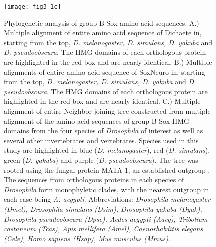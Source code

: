\begin{figure}[H]
\centering
\texttt{[image: fig3-1c]}
\caption{Phylogenetic analysis of group B Sox amino acid sequences. A.) Multiple alignment of entire amino acid sequence of Dichaete in, starting from the top, \emph{D. melanogaster, D. simulans, D. yakuba} and \emph{D. pseudoobscura}. The HMG domains of each orthologous protein are highlighted in the red box and are nearly identical. B.) Multiple alignments of entire amino acid sequence of SoxNeuro in, starting from the top, \emph{D. melanogaster, D. simulans, D. yakuba} and \emph{D. pseudoobscura}. The HMG domains of each orthologous protein are highlighted in the red box and are nearly identical. C.) Multiple alignment of entire Neighbor-joining tree constructed from multiple alignment of the amino acid sequences of group B Sox HMG domains from the four species of \emph{Drosophila} of interest as well as several other invertebrates and vertebrates. Species used in this study are highlighted in blue (\emph{D. melanogaster}), red (\emph{D. simulans}), green (\emph{D. yakuba}) and purple (\emph{D. pseudoobscura}). The tree was rooted using the fungal protein MATA-1, an established outgroup \citep{laudet_ancestry_1993}. The sequences from orthologous proteins in each species of \emph{Drosophila} form monophyletic clades, with the nearest outgroup in each case being \emph{A. aegypti}. Abbreviations: \emph{Drosophila melanogaster (Dmel), Drosophila simulans (Dsim), Drosophila yakuba (Dyak), Drosophila pseudoobscura (Dpse), Aedes aegypti (Aaeg), Tribolium castaneum (Tcas), Apis mellifera (Amel), Caenorhabditis elegans (Cele), Homo sapiens (Hsap), Mus musculus (Mmus)}.}
\label{Figure 3.1}
\end{figure}

